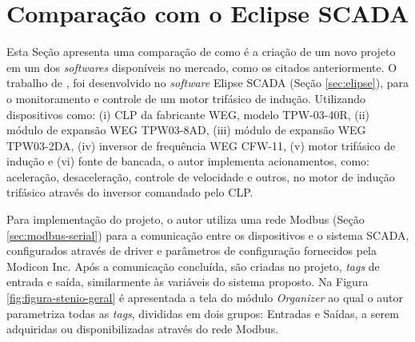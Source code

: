 \section{Comparação com o Eclipse SCADA}
\label{sec:comparacao-eclipse}

Esta Seção apresenta uma comparação de como é a criação de um novo projeto em um dos \textit{softwares} disponíveis no mercado, como os citados anteriormente. O trabalho de  , foi desenvolvido no \textit{software} Elipse SCADA (Seção \ref{sec:elipse}), para o monitoramento e controle de um motor trifásico de indução. Utilizando dispositivos como: (i) \gls{CLP} da fabricante WEG, modelo TPW-03-40R, (ii) módulo de expansão WEG TPW03-8AD, (iii) módulo de expansão WEG TPW03-2DA, (iv) inversor de frequência WEG CFW-11, (v) motor trifásico de indução e (vi) fonte de bancada, o autor implementa acionamentos, como: aceleração, desaceleração, controle de velocidade e outros, no motor de indução trifásico através do inversor comandado pelo \gls{CLP}.

Para implementação do projeto, o autor utiliza uma rede Modbus (Seção \ref{sec:modbus-serial}) para a comunicação entre os dispositivos e o sistema \gls{SCADA}, configurados através de driver e parâmetros de configuração fornecidos pela Modicon Inc. Após a comunicação concluída, são criadas no projeto, \textit{tags} de entrada e saída, similarmente às variáveis do sistema proposto. Na Figura \ref{fig:figura-stenio-geral} é apresentada a tela do módulo \textit{Organizer} ao qual o autor parametriza todas as \textit{tags}, divididas em dois grupos: Entradas e Saídas, a serem adquiridas ou disponibilizadas através do rede Modbus.

        \begin{figure}[!h]
    	\end{figure}
    	
